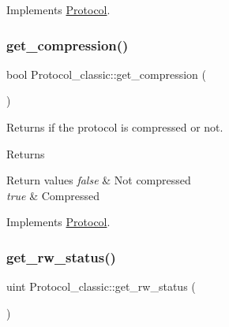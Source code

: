 Implements \mbox{\hyperlink{classProtocol_a636debc9b25f4e60864902cdd1b3e87a}{Protocol}}.

\mbox{\label{classProtocol__classic_a1047a7e461d69ff592d8cabe9d89fbe2}} 
\subsubsection{\texorpdfstring{get\+\_\+compression()}{get\_compression()}}
{\footnotesize\ttfamily bool Protocol\+\_\+classic\+::get\+\_\+compression (\begin{DoxyParamCaption}{ }\end{DoxyParamCaption})\hspace{0.3cm}{\ttfamily [virtual]}}

Returns if the protocol is compressed or not.

\begin{DoxyReturn}{Returns}

\end{DoxyReturn}

\begin{DoxyRetVals}{Return values}
{\em false} & Not compressed \\
\hline
{\em true} & Compressed \\
\hline
\end{DoxyRetVals}


Implements \mbox{\hyperlink{classProtocol_a7b500a3f2e52a98903d853b8f365ac7d}{Protocol}}.

\mbox{\label{classProtocol__classic_aecc686ca92164845b33a39683eb7ac2b}} 
\subsubsection{\texorpdfstring{get\+\_\+rw\+\_\+status()}{get\_rw\_status()}}
{\footnotesize\ttfamily uint Protocol\+\_\+classic\+::get\+\_\+rw\+\_\+status (\begin{DoxyParamCaption}{ }\end{DoxyParamCaption})\hspace{0.3cm}{\ttfamily [virtual]}}

